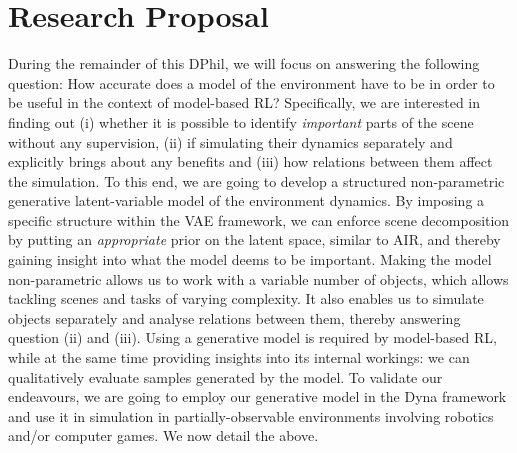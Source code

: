 \section{Research Proposal}
\label{sec:proposal}

%    
%    
%
%    
%    
    
    During the remainder of this DPhil, we will focus on answering the following question: How accurate does a model of the environment have to be in order to be useful in the context of model-based RL? Specifically, we are interested in finding out 
    (i) whether it is possible to identify \emph{important} parts of the scene without any supervision, 
    (ii) if simulating their dynamics separately and explicitly brings about any benefits and 
    (iii) how relations between them affect the simulation.
    To this end, we are going to develop a structured non-parametric generative latent-variable model of the environment dynamics.
    By imposing a specific structure within the VAE framework, we can enforce scene decomposition by putting an \emph{appropriate} prior on the latent space, similar to AIR, and thereby gaining insight into what the model deems to be important.
    Making the model non-parametric allows us to work with a variable number of objects, which allows tackling scenes and tasks of varying complexity.
    It also enables us to simulate objects separately and analyse relations between them, thereby answering question (ii) and (iii).
    Using a generative model is required by model-based RL, while at the same time providing insights into its internal workings: we can qualitatively evaluate samples generated by the model. 
    To validate our endeavours, we are going to employ our generative model in the Dyna framework and use it in simulation in partially-observable environments involving robotics and/or computer games. We now detail the above.

